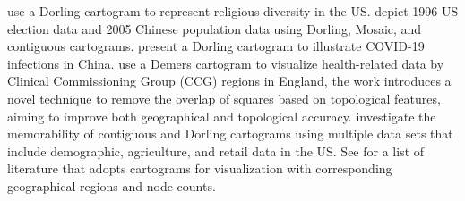{
\renewcommand{\arraystretch}{1.5}
\begin{table}[!tb]
	\centering
	\caption{ Trade-off between dimensions.  Dimension sacrificed in order to improve  target dimension's accuracy.}
	\label{table:accuracy}
\end{table}
}

\citet{warf2008Geography} use a Dorling cartogram to represent religious diversity in the US. \citet{sun2010Effectiveness} depict 1996 US election data and 2005 Chinese population data using Dorling, Mosaic, and contiguous cartograms. \citet{gao2020Visualising} present a Dorling cartogram to illustrate COVID-19 infections in China. \citet{tong2018Cartograms} use a Demers cartogram to visualize health-related data by Clinical Commissioning Group (CCG) regions in England, the work introduces a novel technique to remove the overlap of squares based on topological features, aiming to improve both geographical and topological accuracy. \citet{nusrat2020Recognition} investigate the memorability of contiguous and Dorling cartograms using multiple data sets that include demographic, agriculture, and retail data in the US. See  for a list of literature that adopts cartograms for visualization with corresponding geographical regions and node counts.

